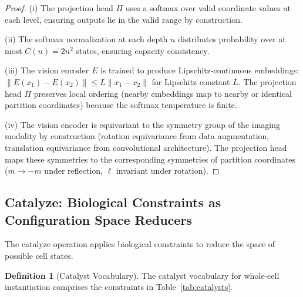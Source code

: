 \documentclass[twocolumn,10pt,a4paper]{article}
\theoremstyle{definition}
\newtheorem{definition}[theorem]{Definition}
\theoremstyle{remark}
\begin{document}
\begin{proof}
(i) The projection head $\Pi$ uses a softmax over valid coordinate values at each level, ensuring outputs lie in the valid range by construction.

(ii) The softmax normalization at each depth $n$ distributes probability over at most $C(n) = 2n^2$ states, ensuring capacity consistency.

(iii) The vision encoder $E$ is trained to produce Lipschitz-continuous embeddings: $\|E(x_1) - E(x_2)\| \leq L \|x_1 - x_2\|$ for Lipschitz constant $L$. The projection head $\Pi$ preserves local ordering (nearby embeddings map to nearby or identical partition coordinates) because the softmax temperature is finite.

(iv) The vision encoder is equivariant to the symmetry group of the imaging modality by construction (rotation equivariance from data augmentation, translation equivariance from convolutional architecture). The projection head maps these symmetries to the corresponding symmetries of partition coordinates ($m \to -m$ under reflection, $\ell$ invariant under rotation).
\end{proof}

\subsection{Catalyze: Biological Constraints as Configuration Space Reducers}

The catalyze operation applies biological constraints to reduce the space of possible cell states.

\begin{definition}[Catalyst Vocabulary]
\label{def:catalyst_vocab}
The catalyst vocabulary for whole-cell instantiation comprises the constraints in Table~\ref{tab:catalysts}.
\end{definition}
\end{document}
